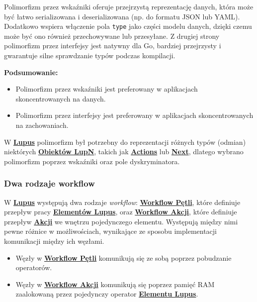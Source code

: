 Polimorfizm przez wskaźniki oferuje przejrzystą reprezentację danych, która może być łatwo serializowana i deserializowana (np. do formatu JSON lub YAML). Dodatkowo wspiera włączenie pola \texttt{type} jako części modelu danych, dzięki czemu może być ono również przechowywane lub przesyłane. Z drugiej strony polimorfizm przez interfejsy jest natywny dla Go, bardziej przejrzysty i gwarantuje silne sprawdzanie typów podczas kompilacji.

\textbf{Podsumowanie:}

\begin{itemize}
    \item Polimorfizm przez wskaźniki jest preferowany w aplikacjach skoncentrowanych na danych.
    \item Polimorfizm przez interfejsy jest preferowany w aplikacjach skoncentrowanych na zachowaniach.
\end{itemize}

W \hyperlink{def:lupus}{\textbf{Lupus}} polimorfizm był potrzebny do reprezentacji różnych typów (odmian) niektórych \hyperlink{def:element}{\textbf{Obiektów LupN}}, takich jak \hyperlink{def:akcja}{\textbf{Actions}} lub \hyperlink{def:next}{\textbf{Next}}, dlatego wybrano polimorfizm poprzez wskaźniki oraz pole dyskryminatora.

\subsubsection{Dwa rodzaje workflow}

W \hyperlink{def:lupus}{\textbf{Lupus}} występują dwa rodzaje \textit{workflow}: \hyperlink{def:workflow-petli}{\textbf{Workflow Pętli}}, które definiuje przepływ pracy \hyperlink{def:element-lupus}{\textbf{Elementów Lupus}}, oraz \hyperlink{def:workflow-petli}{\textbf{Workflow Akcji}}, które definiuje przepływ \hyperlink{def:akcja}{\textbf{Akcji}} we wnętrzu pojedynczego elementu. Występują między nimi pewne różnice w możliwościach, wynikające ze sposobu implementacji komunikacji między ich węzłami.

\begin{itemize}
    \item Węzły w \hyperlink{def:workflow-petli}{\textbf{Workflow Pętli}} komunikują się ze sobą poprzez pobudzanie operatorów.
    \item Węzły w \hyperlink{def:workflow-petli}{\textbf{Workflow Akcji}} komunikują się poprzez pamięć RAM zaalokowaną przez pojedynczy operator \hyperlink{def:element-lupus}{\textbf{Elementu Lupus}}.
\end{itemize}

